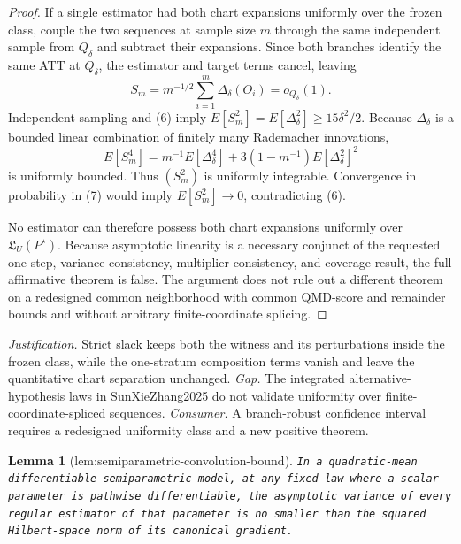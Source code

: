 \documentclass{article}
\newtheorem{lemma}{Lemma}
\begin{document}
\begin{proof}
If a single estimator had both chart expansions uniformly over the frozen class, couple the two sequences at sample size \(m\) through the same independent sample from \(Q_\delta\) and subtract their expansions.  Since both branches identify the same ATT at \(Q_\delta\), the estimator and target terms cancel, leaving
\[
 S_m=m^{-1/2}\sum_{i=1}^m\Delta_\delta(O_i)=o_{Q_\delta}(1).
 \tag{7}
\]
Independent sampling and (6) imply \(E[S_m^2]=E[\Delta_\delta^2]\ge15\delta^2/2\).  Because \(\Delta_\delta\) is a bounded linear combination of finitely many Rademacher innovations,
\[
 E[S_m^4]
 =m^{-1}E[\Delta_\delta^4]
 +3(1-m^{-1})E[\Delta_\delta^2]^2
 \tag{8}
\]
is uniformly bounded.  Thus \((S_m^2)\) is uniformly integrable.  Convergence in probability in (7) would imply \(E[S_m^2]\to0\), contradicting (6).

No estimator can therefore possess both chart expansions uniformly over \(\mathfrak L_U(P^{\star})\).  Because asymptotic linearity is a necessary conjunct of the requested one-step, variance-consistency, multiplier-consistency, and coverage result, the full affirmative theorem is false.  The argument does not rule out a different theorem on a redesigned common neighborhood with common QMD-score and remainder bounds and without arbitrary finite-coordinate splicing.
\end{proof}
\par\smallskip\noindent \textit{Justification.} Strict slack keeps both the witness and its perturbations inside the frozen class, while the one-stratum composition terms vanish and leave the quantitative chart separation unchanged. \textit{Gap.} The integrated alternative-hypothesis laws in SunXieZhang2025 do not validate uniformity over finite-coordinate-spliced sequences. \textit{Consumer.} A branch-robust confidence interval requires a redesigned uniformity class and a new positive theorem.

\begin{lemma}[lem:semiparametric-convolution-bound]\label{lem:semiparametric-convolution-bound}
\texttt{In a quadratic-\allowbreak{}mean differentiable semiparametric model,\allowbreak{} at any fixed law where a scalar parameter is pathwise differentiable,\allowbreak{} the asymptotic variance of every regular estimator of that parameter is no smaller than the squared Hilbert-\allowbreak{}space norm of its canonical gradient.}
\end{lemma}
\end{document}
